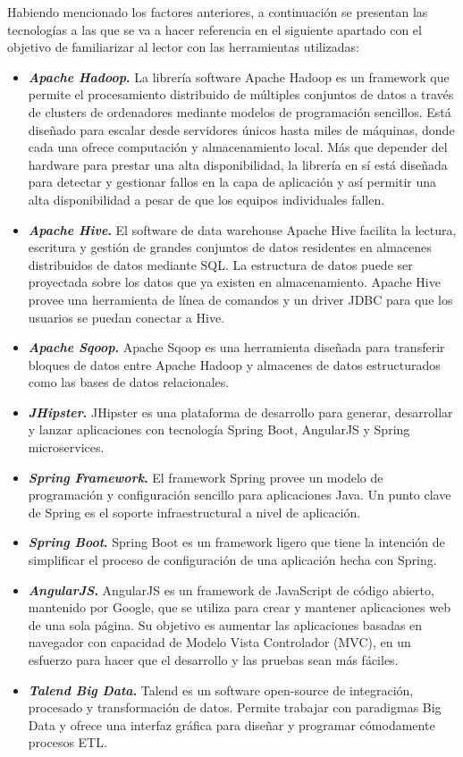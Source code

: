 Habiendo mencionado los factores anteriores, a continuación se presentan las tecnologías a las que se va a hacer referencia en el siguiente apartado con el objetivo de familiarizar al lector con las herramientas utilizadas:
\begin{itemize}
\item \textbf{\textit{Apache Hadoop}.} \cite{hadoop} La librería software Apache Hadoop es un framework que permite el procesamiento distribuido de múltiples conjuntos de datos a través de clusters de ordenadores mediante modelos de programación sencillos. Está diseñado para escalar desde servidores únicos hasta miles de máquinas, donde cada una ofrece computación y almacenamiento local. Más que depender del hardware para prestar una alta disponibilidad, la librería en sí está diseñada para detectar y gestionar fallos en la capa de aplicación y así permitir una alta disponibilidad a pesar de que los equipos individuales fallen. 
\item \textbf{\textit{Apache Hive}.} \cite{hive}  El software de data warehouse Apache Hive facilita la lectura, escritura y gestión de grandes conjuntos de datos residentes en almacenes distribuidos de datos mediante SQL. La estructura de datos puede ser proyectada sobre los datos que ya existen en almacenamiento. Apache Hive provee una herramienta de línea de comandos y un driver JDBC para que los usuarios se puedan conectar a Hive. 
\item \textbf{\textit{Apache Sqoop}.} \cite{sqoop} Apache Sqoop es una herramienta diseñada para transferir bloques de datos entre Apache Hadoop y almacenes de datos estructurados como las bases de datos relacionales.
\item \textbf{\textit{JHipster}.} \cite{jhipster} JHipster es una plataforma de desarrollo para generar, desarrollar y lanzar aplicaciones con tecnología Spring Boot, AngularJS y Spring microservices. 
\item \textbf{\textit{Spring Framework}.} \cite{springframework} El framework Spring provee un modelo de programación y configuración sencillo para aplicaciones Java. Un punto clave de Spring es el soporte infraestructural a nivel de aplicación. 
\item \textbf{\textit{Spring Boot}.} \cite{springboot} Spring Boot es un framework ligero que tiene la intención de simplificar el proceso de configuración de una aplicación hecha con Spring. 
\item \textbf{\textit{AngularJS}.} \cite{angularjs} AngularJS es un framework de JavaScript de código abierto, mantenido por Google, que se utiliza para crear y mantener aplicaciones web de una sola página. Su objetivo es aumentar las aplicaciones basadas en navegador con capacidad de Modelo Vista Controlador (MVC), en un esfuerzo para hacer que el desarrollo y las pruebas sean más fáciles.
\item \textbf{\textit{Talend Big Data}.} \cite{talend} Talend es un software open-source de integración, procesado y transformación de datos. Permite trabajar con paradigmas Big Data y ofrece una interfaz gráfica para diseñar y programar cómodamente procesos ETL. 
\end{itemize}

